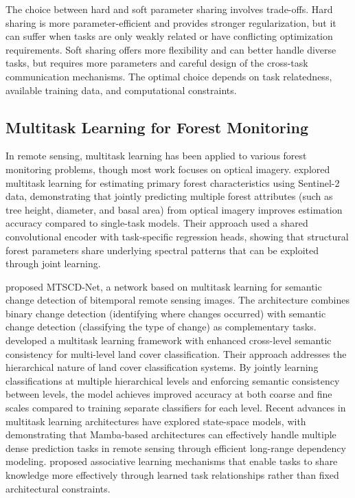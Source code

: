 The choice between hard and soft parameter sharing involves trade-offs. Hard sharing is more parameter-efficient and provides stronger regularization, but it can suffer when tasks are only weakly related or have conflicting optimization requirements. Soft sharing offers more flexibility and can better handle diverse tasks, but requires more parameters and careful design of the cross-task communication mechanisms. The optimal choice depends on task relatedness, available training data, and computational constraints.

\subsection{Multitask Learning for Forest Monitoring}

In remote sensing, multitask learning has been applied to various forest monitoring problems, though most work focuses on optical imagery. \cite{plotnikov_multitask_2025} explored multitask learning for estimating primary forest characteristics using Sentinel-2 data, demonstrating that jointly predicting multiple forest attributes (such as tree height, diameter, and basal area) from optical imagery improves estimation accuracy compared to single-task models. Their approach used a shared convolutional encoder with task-specific regression heads, showing that structural forest parameters share underlying spectral patterns that can be exploited through joint learning.

\cite{cui_mtscd-net_2023} proposed MTSCD-Net, a network based on multitask learning for semantic change detection of bitemporal remote sensing images. The architecture combines binary change detection (identifying where changes occurred) with semantic change detection (classifying the type of change) as complementary tasks. \cite{tao_multi-task_2025} developed a multitask learning framework with enhanced cross-level semantic consistency for multi-level land cover classification. Their approach addresses the hierarchical nature of land cover classification systems. By jointly learning classifications at multiple hierarchical levels and enforcing semantic consistency between levels, the model achieves improved accuracy at both coarse and fine scales compared to training separate classifiers for each level. Recent advances in multitask learning architectures have explored state-space models, with \cite{shen_learning_2025} demonstrating that Mamba-based architectures can effectively handle multiple dense prediction tasks in remote sensing through efficient long-range dependency modeling. \cite{liu_associatively_2022} proposed associative learning mechanisms that enable tasks to share knowledge more effectively through learned task relationships rather than fixed architectural constraints.

